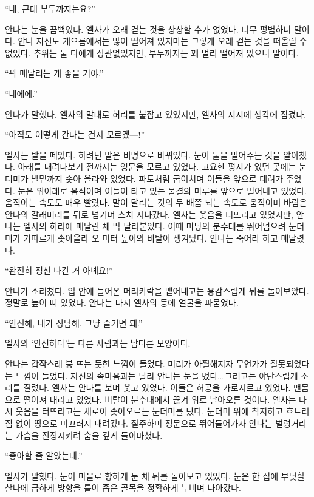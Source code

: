 ``네, 근데 부두까지는요?''

안나는 눈을 끔뻑였다. 엘사가 오래 걷는 것을 상상할 수가 없었다. 너무 평범하니 말이다. 안나 자신도 게으름에서는 많이 떨어져 있지마는 그렇게 오래 걷는 것을 떠올릴 수 없었다. 추위는 둘 다에게 상관없었지만, 부두까지는 꽤 멀리 떨어져 있으니 말이다.

``꽉 매달리는 게 좋을 거야.''

``네에에.''

안나가 말했다. 엘사의 말대로 허리를 붙잡고 있었지만, 엘사의 지시에 생각에 잠겼다.

``아직도 어떻게 간다는 건지 모르겠—!''

엘사는 발을 떼었다. 하려던 말은 비명으로 바뀌었다. 눈이 둘을 밀어주는 것을 알아챘다. 아래를 내려다보기 전까지는 영문을 모르고 있었다. 고요한 평지가 있던 곳에는 눈더미가 발밑까지 솟아 올라와 있었다. 파도처럼 굽이치며 이들을 앞으로 데려가 주었다. 눈은 위아래로 움직이며 이들이 타고 있는 물결의 마루를 앞으로 밀어내고 있었다. 움직이는 속도도 매우 빨랐다. 말이 달리는 것의 두 배쯤 되는 속도로 움직이며 바람은 안나의 갈래머리를 뒤로 넘기며 스쳐 지나갔다. 엘사는 웃음을 터뜨리고 있었지만, 안나는 엘사의 허리에 매달린 채 딱 달라붙었다. 이때 마당의 분수대를 뛰어넘으려 눈더미가 가파르게 솟아올라 오 미터 높이의 비탈이 생겨났다. 안나는 죽어라 하고 매달렸다.

``완전히 정신 나간 거 아녜요!''

안나가 소리쳤다. 입 안에 들어온 머리카락을 뱉어내고는 용감스럽게 뒤를 돌아보았다. 정말로 높이 떠 있었다. 안나는 다시 엘사의 등에 얼굴을 파묻었다.

``안전해, 내가 장담해. 그냥 즐기면 돼.''

엘사의 `안전하다'는 다른 사람과는 남다른 모양이다.

안나는 갑작스레 붕 뜨는 듯한 느낌이 들었다. 머리가 아찔해지자 무언가가 잘못되었다는 느낌이 들었다. 자신의 속마음과는 달리 안나는 눈을 떴다\ldots\,그러고는 야단스럽게 소리를 질렀다. 엘사는 안나를 보며 웃고 있었다. 이들은 허공을 가로지르고 있었다. 맨몸으로 떨어져 내리고 있었다. 비탈이 분수대에서 끊겨 위로 날아오른 것이다. 엘사는 다시 웃음을 터뜨리고는 새로이 솟아오르는 눈더미를 탔다. 눈더미 위에 착지하고 흐트러짐 없이 땅으로 미끄러져 내려갔다. 질주하며 정문으로 뛰어들어가자 안나는 벌렁거리는 가슴을 진정시키려 숨을 깊게 들이마셨다.

``좋아할 줄 알았는데.''

엘사가 말했다. 눈이 마을로 향하게 둔 채 뒤를 돌아보고 있었다. 눈은 한 집에 부딪힐 찰나에 급하게 방향을 틀어 좁은 골목을 정확하게 누비며 나아갔다.

